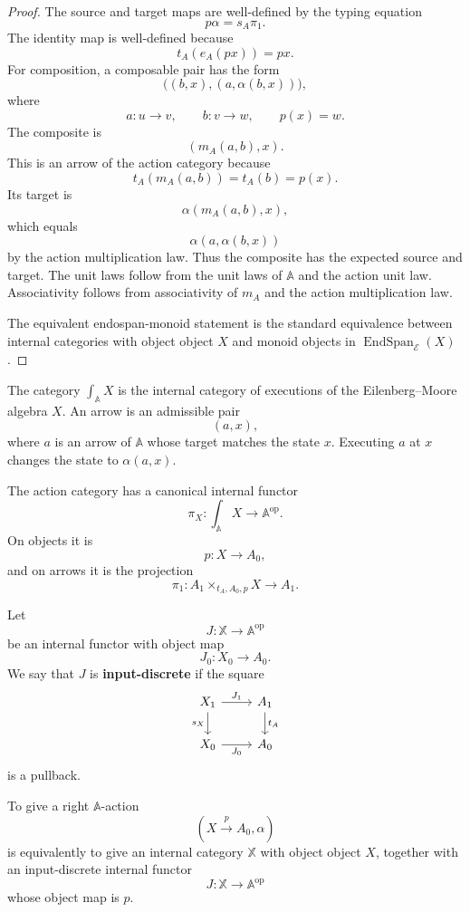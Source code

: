 \begin{proof}
The source and target maps are well-defined by the typing equation
\[
p\alpha=s_A\pi_1.
\]
The identity map is well-defined because
\[
t_A(e_A(px))=px.
\]
For composition, a composable pair has the form
\[
\bigl((b,x),(a,\alpha(b,x))\bigr),
\]
where
\[
a:u\to v,
\qquad
b:v\to w,
\qquad
p(x)=w.
\]
The composite is
\[
(m_A(a,b),x).
\]
This is an arrow of the action category because
\[
t_A(m_A(a,b))=t_A(b)=p(x).
\]
Its target is
\[
\alpha(m_A(a,b),x),
\]
which equals
\[
\alpha(a,\alpha(b,x))
\]
by the action multiplication law. Thus the composite has the expected source
and target. The unit laws follow from the unit laws of \(\mathbb A\) and the
action unit law. Associativity follows from associativity of \(m_A\) and the
action multiplication law.

The equivalent endospan-monoid statement is the standard equivalence between
internal categories with object object \(X\) and monoid objects in
\(\operatorname{EndSpan}_{\mathcal E}(X)\).
\end{proof}

\begin{remark}
\label{rem:action-category-execution}
The category \(\int_{\mathbb A}X\) is the internal category of executions of
the Eilenberg--Moore algebra \(X\). An arrow is an admissible pair
\[
(a,x),
\]
where \(a\) is an arrow of \(\mathbb A\) whose target matches the state \(x\).
Executing \(a\) at \(x\) changes the state to \(\alpha(a,x)\).
\end{remark}

The action category has a canonical internal functor
\[
\pi_X:\int_{\mathbb A}X\to\mathbb A^{\mathrm{op}}.
\]
On objects it is
\[
p:X\to A_0,
\]
and on arrows it is the projection
\[
\pi_1:A_1\times_{t_A,A_0,p}X\to A_1.
\]

\begin{definition}
\label{def:input-discrete-relative}
Let
\[
J:\mathbb X\to\mathbb A^{\mathrm{op}}
\]
be an internal functor with object map
\[
J_0:X_0\to A_0.
\]
We say that \(J\) is \textbf{input-discrete} if the square
\[
\begin{tikzcd}
X_1 \arrow[r,"J_1"] \arrow[d,"s_X"']
&
A_1 \arrow[d,"t_A"]
\\
X_0 \arrow[r,"J_0"']
&
A_0
\end{tikzcd}
\]
is a pullback.
\end{definition}

\begin{theorem}
\label{thm:actions-as-input-discrete-relative}
To give a right \(\mathbb A\)-action
\[
(X\xrightarrow{p}A_0,\alpha)
\]
is equivalently to give an internal category \(\mathbb X\) with object object
\(X\), together with an input-discrete internal functor
\[
J:\mathbb X\to\mathbb A^{\mathrm{op}}
\]
whose object map is \(p\).
\end{theorem}

